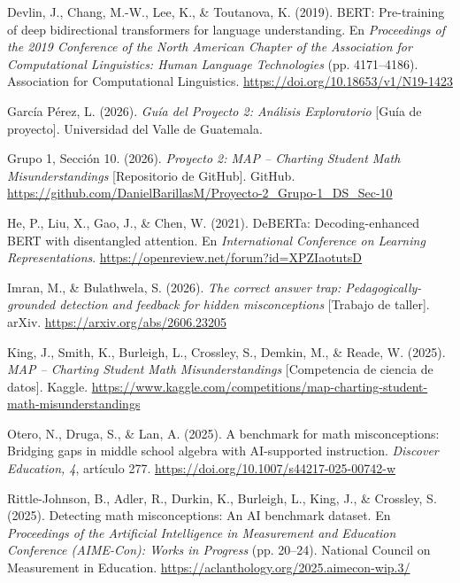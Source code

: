 \documentclass[11pt,oneside,openany]{book}
\begin{document}
\begin{list}{}{%
  \setlength{\leftmargin}{1.27cm}
  \setlength{\itemindent}{-1.27cm}
  \setlength{\itemsep}{0.85em}
  \setlength{\parsep}{0pt}}

\item Devlin, J., Chang, M.-W., Lee, K., \& Toutanova, K. (2019). BERT:
Pre-training of deep bidirectional transformers for language understanding. En
\emph{Proceedings of the 2019 Conference of the North American Chapter of the
Association for Computational Linguistics: Human Language Technologies}
(pp. 4171--4186). Association for Computational Linguistics.
\url{https://doi.org/10.18653/v1/N19-1423}

\item García Pérez, L. (2026). \emph{Guía del Proyecto 2: Análisis
Exploratorio} [Guía de proyecto]. Universidad del Valle de Guatemala.

\item Grupo 1, Sección 10. (2026). \emph{Proyecto 2: MAP -- Charting Student
Math Misunderstandings} [Repositorio de GitHub]. GitHub.
\url{https://github.com/DanielBarillasM/Proyecto-2_Grupo-1_DS_Sec-10}

\item He, P., Liu, X., Gao, J., \& Chen, W. (2021). DeBERTa:
Decoding-enhanced BERT with disentangled attention. En \emph{International
Conference on Learning Representations}.
\url{https://openreview.net/forum?id=XPZIaotutsD}

\item Imran, M., \& Bulathwela, S. (2026). \emph{The correct answer trap:
Pedagogically-grounded detection and feedback for hidden misconceptions}
[Trabajo de taller]. arXiv. \url{https://arxiv.org/abs/2606.23205}

\item King, J., Smith, K., Burleigh, L., Crossley, S., Demkin, M., \& Reade,
W. (2025). \emph{MAP -- Charting Student Math Misunderstandings} [Competencia
de ciencia de datos]. Kaggle.
\url{https://www.kaggle.com/competitions/map-charting-student-math-misunderstandings}

\item Otero, N., Druga, S., \& Lan, A. (2025). A benchmark for math
misconceptions: Bridging gaps in middle school algebra with AI-supported
instruction. \emph{Discover Education, 4}, artículo 277.
\url{https://doi.org/10.1007/s44217-025-00742-w}

\item Rittle-Johnson, B., Adler, R., Durkin, K., Burleigh, L., King, J., \&
Crossley, S. (2025). Detecting math misconceptions: An AI benchmark dataset.
En \emph{Proceedings of the Artificial Intelligence in Measurement and
Education Conference (AIME-Con): Works in Progress} (pp. 20--24). National
Council on Measurement in Education.
\url{https://aclanthology.org/2025.aimecon-wip.3/}


\end{list}
\end{document}
